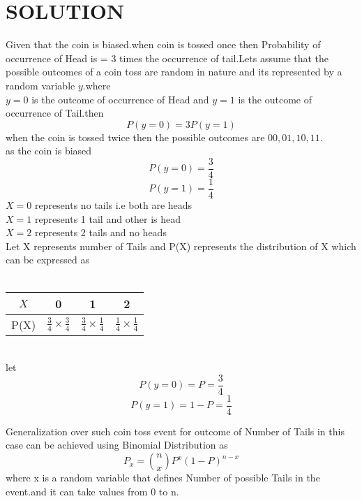 \documentclass[journal,12pt,twocolumn]{IEEEtran}
\begin{document}
\section{SOLUTION}
Given that the coin is biased.when coin is tossed once then
Probability of occurrence of Head is = 3 times the occurrence of tail.Lets assume that the possible outcomes of a coin toss are random in nature and its represented by a random variable $y$.where \\
$y=0$ is the outcome of occurrence of Head and $y=1$ is the outcome of occurrence of Tail.then
\begin{equation}
    P(y=0)=3 P(y=1)
\end{equation}
when the coin is tossed twice then the possible outcomes are   $00,01,10,11$.\\
as the coin is biased 
\begin{equation*}
    P(y=0)=\frac{3}{4} 
\end{equation*}
\begin{equation*}
    P(y=1)=\frac{1}{4}
\end{equation*}
$X=0$ represents no tails i.e both are heads\\
$X=1$ represents 1 tail and other is head\\
$X=2$ represents 2 tails and no heads\\
Let X represents number of Tails and P(X) represents the distribution of  X which can be expressed as\\ \\
\begin{tabular}{|c|c|c|c|}
\hline
   $X$  & 0 & 1 & 2 \\
\hline
  P(X) & $\frac{3}{4}\times \frac{3}{4}$ &$\frac{3}{4}\times \frac{1}{4}$ & $ \frac{1}{4}\times \frac{1}{4}$ \\
  \hline
\end{tabular}\\
\newline
let 
\begin{equation*}
    P(y=0)=P=\frac{3}{4}
\end{equation*}
\begin{equation*}
     P(y=1)=1-P=\frac{1}{4}
\end{equation*}
   
Generalization over such coin toss event for outcome of Number of Tails in this case can be achieved using Binomial Distribution as
\begin{equation*}
    P_x= \binom{n}{x} P^x (1-P)^{n-x}
\end{equation*}
where x is a random variable that defines Number of possible Tails in the event.and it can take values from 0 to n.
\end{document}
